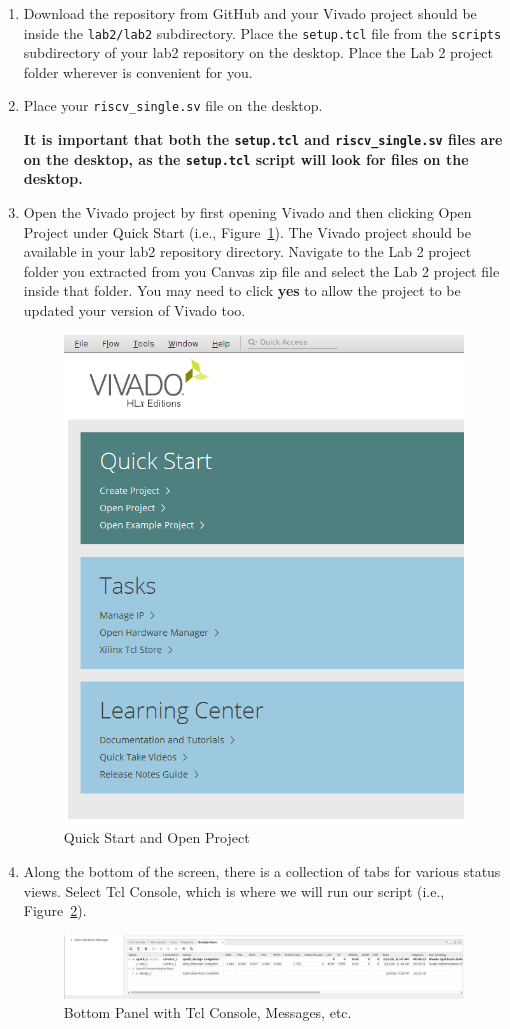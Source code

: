 \documentclass{article}
\begin{document}
\begin{enumerate}
\item Download the repository from GitHub and your Vivado project
  should be inside the \verb|lab2/lab2| subdirectory.  Place the
  \verb|setup.tcl| file from the \verb!scripts! subdirectory of your lab2 repository
  on the desktop.  Place the Lab 2 project folder wherever
is convenient for you.

\item Place your \verb|riscv_single.sv| file on the desktop.

\textbf{It is important that both the \texttt{setup.tcl} and
\texttt{riscv\_single.sv} files are on the desktop, as the \texttt{setup.tcl}
script will look for files on the desktop.}

\item Open the Vivado project by first opening Vivado and then clicking Open
  Project under Quick Start (i.e., Figure~\ref{fig:openproject}).
  The Vivado project should be available in your lab2 repository directory.
  Navigate to the Lab 2 project folder
  you extracted from you Canvas zip file and select the Lab 2 project file inside
that folder.  You may need to click \textbf{yes} to allow the project
to be updated your version of Vivado too.
\begin{figure}[h!]
  \centering
  \includegraphics[width=0.4\linewidth]{open_project}
  \caption{Quick Start and Open Project}
  \label{fig:openproject}
\end{figure}

\item Along the bottom of the screen, there is a collection of tabs for various
status views.  Select Tcl Console, which is where we will run our
script (i.e., Figure~\ref{fig:tclconsole}).
\begin{figure}[h!]
  \centering
  \includegraphics[width=1\linewidth]{tcl_console}
  \caption{Bottom Panel with Tcl Console, Messages, etc.}
  \label{fig:tclconsole}
\end{figure}


\end{enumerate}
\end{document}
